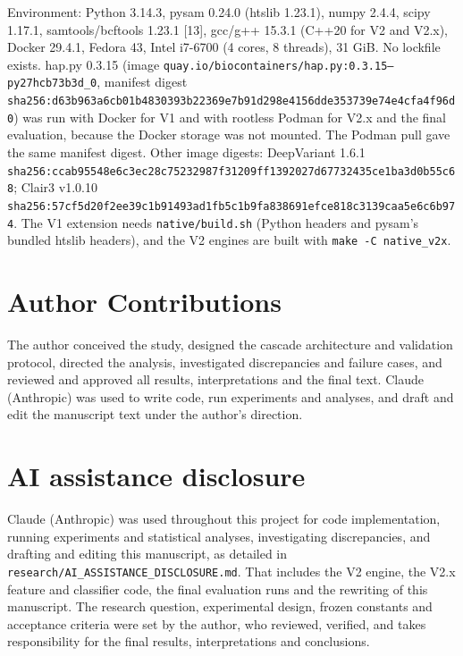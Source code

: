\documentclass[11pt,a4paper]{article}
\makeatletter
\newcommand{\needspace}[1]{\par\ifdim\pagegoal=\maxdimen\else\dimen@=\pagegoal\advance\dimen@-\pagetotal\ifdim\dimen@<#1\relax\newpage\fi\fi}
\makeatother
\begin{document}
Environment: Python 3.14.3, pysam 0.24.0 (htslib 1.23.1), numpy 2.4.4, scipy 1.17.1, samtools/bcftools 1.23.1 [13], gcc/g++ 15.3.1 (C++20 for V2 and V2.x), Docker 29.4.1, Fedora 43, Intel i7-6700 (4 cores, 8 threads), 31 GiB. No lockfile exists. hap.py 0.3.15 (image \texttt{quay.\allowbreak{}io/\allowbreak{}biocontainers/\allowbreak{}hap.\allowbreak{}py:0.\allowbreak{}3.\allowbreak{}15--py27hcb73b3d\_\allowbreak{}0}, manifest digest \texttt{sha256:d63b963a\allowbreak{}6cb01b48\allowbreak{}30393b22\allowbreak{}369e7b91\allowbreak{}d298e415\allowbreak{}6dde3537\allowbreak{}39e74e4c\allowbreak{}fa4f96d0}) was run with Docker for V1 and with rootless Podman for V2.x and the final evaluation, because the Docker storage was not mounted. The Podman pull gave the same manifest digest. Other image digests: DeepVariant 1.6.1 \texttt{sha256:ccab9554\allowbreak{}8e6c3ec2\allowbreak{}8c752329\allowbreak{}87f31209\allowbreak{}ff139202\allowbreak{}7d677324\allowbreak{}35ce1ba3\allowbreak{}d0b55c68}; Clair3 v1.0.10 \texttt{sha256:57cf5d20\allowbreak{}f2ee39c1\allowbreak{}b91493ad\allowbreak{}1fb5c1b9\allowbreak{}fa838691\allowbreak{}efce818c\allowbreak{}3139caa5\allowbreak{}e6c6b974}. The V1 extension needs \texttt{native/\allowbreak{}build.\allowbreak{}sh} (Python headers and pysam's bundled htslib headers), and the V2 engines are built with \texttt{make -C native\_\allowbreak{}v2x}.

\FloatBarrier
\needspace{10\baselineskip}
\section*{\texorpdfstring{Author Contributions}{Author Contributions}}
The author conceived the study, designed the cascade architecture and validation protocol, directed the analysis, investigated discrepancies and failure cases, and reviewed and approved all results, interpretations and the final text. Claude (Anthropic) was used to write code, run experiments and analyses, and draft and edit the manuscript text under the author's direction.

\FloatBarrier
\needspace{10\baselineskip}
\section*{\texorpdfstring{AI assistance disclosure}{AI assistance disclosure}}
Claude (Anthropic) was used throughout this project for code implementation, running experiments and statistical analyses, investigating discrepancies, and drafting and editing this manuscript, as detailed in \texttt{research/\allowbreak{}AI\_\allowbreak{}ASSISTANCE\_\allowbreak{}DISCLOSURE.\allowbreak{}md}. That includes the V2 engine, the V2.x feature and classifier code, the final evaluation runs and the rewriting of this manuscript. The research question, experimental design, frozen constants and acceptance criteria were set by the author, who reviewed, verified, and takes responsibility for the final results, interpretations and conclusions.
\end{document}
